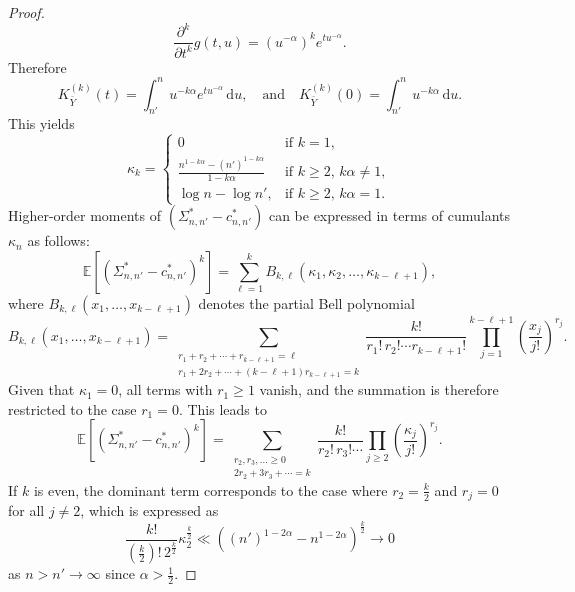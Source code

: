 \documentclass[11pt,twoside,a4paper,reqno]{amsart}
\renewcommand{\d}{\, \text{d}}
\newcommand{\E}{\mathbb{E}}
\begin{document}
\begin{proof}
\begin{equation*}
\frac{\partial^k}{\partial t^k} g(t, u) = (u^{-\alpha})^k e^{t u^{-\alpha}}.
\end{equation*}
Therefore
\begin{equation*}
K_{\bar{Y}}^{(k)}(t) = \int_{n'}^{n} u^{-k\alpha} e^{t u^{-\alpha}} \d u, \quad \text{and} \quad K_{\bar{Y}}^{(k)}(0) = \int_{n'}^{n} u^{-k\alpha} \d u.
\end{equation*}
This yields
\begin{equation*}
\kappa_k = \begin{cases}
0 & \text{if } k = 1, \\
\frac{n^{1-k\alpha} - (n')^{1-k\alpha}}{1 - k\alpha} &\text{if } k \geq 2,\, k\alpha \neq 1, \\
\log n -\log n', &\text{if } k \geq 2,\, k\alpha = 1.
\end{cases}
\end{equation*}
Higher-order moments of $\left(\Sigma^*_{n,n'}-c^*_{n,n'}\right)$ can be expressed in terms of cumulants $\kappa_n$
as follows:
\begin{equation*}
\E\left[\left(\Sigma^*_{n,n'}-c^*_{n,n'}\right)^k\right]= \sum_{\ell=1}^k B_{k,\ell}(\kappa_1, \kappa_2, \dots, \kappa_{k-\ell+1}),
\end{equation*}
where $B_{k,\ell}(x_1, \dots, x_{k-\ell+1})$ denotes the partial Bell polynomial
\begin{equation*}
B_{k,\ell}(x_1,\ldots,x_{k-\ell+1})
=\sum_{\substack{
r_1+r_2+\cdots+r_{k-\ell+1}=\ell\\
r_1+2r_2+\cdots+(k-\ell+1)r_{k-\ell+1}=k
}}
\frac{k!}{r_1!\,r_2!\cdots r_{k-\ell+1}!}
\prod_{j=1}^{k-\ell+1}\left(\frac{x_j}{j!}\right)^{r_j}.
\end{equation*}
Given that $ \kappa_1=0 $, all terms with $ r_1 \geq 1 $ vanish, and the summation is therefore restricted to the case $ r_1 = 0 $. This leads to
\begin{equation*}
\E\left[\left(\Sigma^*_{n,n'}-c^*_{n,n'}\right)^k\right]= \sum_{\substack{r_2, r_3, \dots \geq 0 \\ 2r_2 + 3r_3 + \cdots = k}} \frac{k!}{r_2!\,r_3! \cdots} \prod_{j \geq 2} \left( \frac{\kappa_j}{j!} \right)^{r_j}.
\end{equation*}
If $k$ is even, the dominant term corresponds to the case where $r_2=\frac{k}{2}$ and $ r_j = 0 $ for all $ j \neq 2 $, which is expressed as
\begin{equation*}
\frac{k!}{(\frac{k}{2})!\,2^{\frac{k}{2}}} \kappa_2^{\frac{k}{2}}\ll \left((n')^{1-2\alpha}-n^{1-2\alpha}\right)^{\frac{k}{2}}\to 0
\end{equation*}
as $n>n'\to\infty$ since $\alpha>\frac{1}{2}.$



\end{proof}
\end{document}
